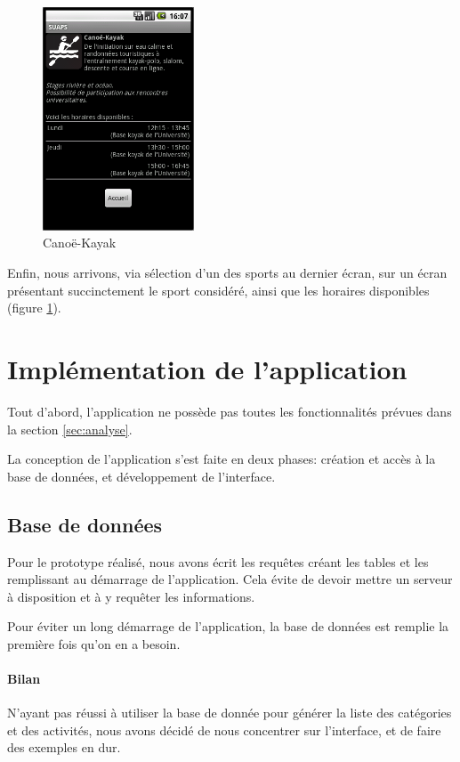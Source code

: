 \documentclass[french, titlepage, 11pt, a4paper]{article}
\begin{document}
	\begin{figure}[htb]
		\centering
		\includegraphics[width=0.4\textwidth]{canoekayak.png}
		\caption{Canoë-Kayak}
		\label{fig:canoekayak}
	\end{figure}

	Enfin, nous arrivons, via sélection d'un des sports au dernier écran, sur un
	écran présentant succinctement le sport considéré, ainsi que les horaires
	disponibles (figure \ref{fig:canoekayak}).



\section{Implémentation de l'application}

    Tout d'abord, l'application ne possède pas toutes les fonctionnalités
    prévues dans la section \ref{sec:analyse}.


    La conception de l'application s'est faite en deux phases: création et accès
    à la base de données, et développement de l'interface.

    \subsection{Base de données}

        Pour le prototype réalisé, nous avons écrit les requêtes créant les
        tables et les remplissant au démarrage de l'application. Cela évite de
        devoir mettre un serveur à disposition et à y requêter les informations.

        Pour éviter un long démarrage de l'application, la base de données est
        remplie la première fois qu'on en a besoin.

        \paragraph{Bilan} N'ayant pas réussi à utiliser la base de donnée pour
        générer la liste des catégories et des activités, nous avons décidé de
        nous concentrer sur l'interface, et de faire des exemples en dur.
\end{document}
